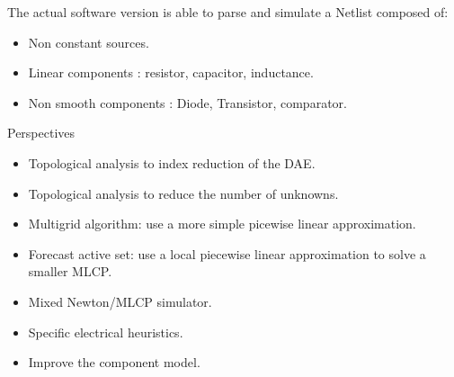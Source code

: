 
\frame
{
\begin{block}{The actual software version is able to parse and simulate a Netlist composed of:}
\begin{itemize}
\item Non constant sources.
\item Linear components : resistor, capacitor, inductance.
\item Non smooth components : Diode, Transistor, comparator.
\end{itemize}
\end{block}
\pause
\begin{block}{Perspectives}
\begin{itemize}
\item Topological analysis to index reduction of the DAE.
\item Topological analysis to reduce the number of unknowns.
\item Multigrid algorithm: use a more simple picewise linear approximation.
\item Forecast active set: use a local piecewise linear approximation to solve a smaller MLCP.
\item Mixed Newton/MLCP simulator.
\item Specific electrical heuristics.
\item Improve the component model.
\end{itemize}
\end{block}

}

